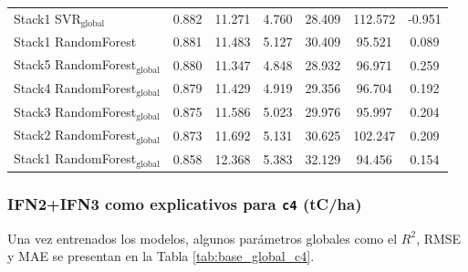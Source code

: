 \begin{table}
{\begin{tabular}{p{4.5cm}cccccc}
        Stack1 SVR$_{\text{global}}$ & 0.882 & 11.271 & 4.760 & 28.409 & 112.572 & -0.951 \\
        Stack1 RandomForest & 0.881 & 11.483 & 5.127 & 30.409 & 95.521 & 0.089 \\
        Stack5 RandomForest$_{\text{global}}$ & 0.880 & 11.347 & 4.848 & 28.932 & 96.971 & 0.259 \\
        Stack4 RandomForest$_{\text{global}}$ & 0.879 & 11.429 & 4.919 & 29.356 & 96.704 & 0.192 \\
        Stack3 RandomForest$_{\text{global}}$ & 0.875 & 11.586 & 5.023 & 29.976 & 95.997 & 0.204 \\
        Stack2 RandomForest$_{\text{global}}$ & 0.873 & 11.692 & 5.131 & 30.625 & 102.247 & 0.209 \\
        Stack1 RandomForest$_{\text{global}}$ & 0.858 & 12.368 & 5.383 & 32.129 & 94.456 & 0.154 \\
            \bottomrule
    \end{tabular}
    }
\end{table}

\subsubsection{IFN2+IFN3 como explicativos para \texttt{c4} (tC/ha)}


Una vez entrenados los modelos, algunos parámetros globales como el $R^2$, RMSE y MAE se presentan en la Tabla \ref{tab:base_global_c4}.

